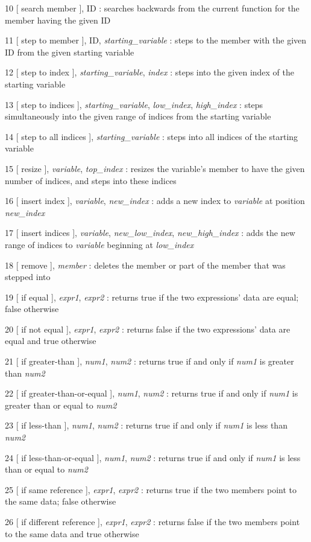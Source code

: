 \documentclass{article}
\begin{document}
\begin{description}
\item{10  [ search member ], ID} : searches backwards from the current function for the member having the given ID
\item{11  [ step to member ], ID, \emph{starting\_variable}} : steps to the member with the given ID from the given starting variable
\item{12  [ step to index ], \emph{starting\_variable}, \emph{index}} : steps into the given index of the starting variable
\item{13  [ step to indices ], \emph{starting\_variable}, \emph{low\_index}, \emph{high\_index}} : steps simultaneously into the given range of indices from the starting variable
\item{14  [ step to all indices ], \emph{starting\_variable}} : steps into all indices of the starting variable
\item{15  [ resize ], \emph{variable}, \emph{top\_index}} : resizes the variable's member to have the given number of indices, and steps into these indices
\item{16  [ insert index ], \emph{variable}, \emph{new\_index}} : adds a new index to \emph{variable} at position \emph{new\_index}
\item{17  [ insert indices ], \emph{variable}, \emph{new\_low\_index}, \emph{new\_high\_index}} : adds the new range of indices to \emph{variable} beginning at \emph{low\_index}
\item{18  [ remove ], \emph{member}} : deletes the member or part of the member that was stepped into

\item{19  [ if equal ], \emph{expr1}, \emph{expr2}} : returns true if the two expressions' data are equal; false otherwise
\item{20  [ if not equal ], \emph{expr1}, \emph{expr2}} : returns false if the two expressions' data are equal and true otherwise
\item{21  [ if greater-than ], \emph{num1}, \emph{num2}} : returns true if and only if \emph{num1} is greater than \emph{num2}
\item{22  [ if greater-than-or-equal ], \emph{num1}, \emph{num2}} : returns true if and only if \emph{num1} is greater than or equal to \emph{num2}
\item{23  [ if less-than ], \emph{num1}, \emph{num2}} : returns true if and only if \emph{num1} is less than \emph{num2}
\item{24  [ if less-than-or-equal ], \emph{num1}, \emph{num2}} : returns true if and only if \emph{num1} is less than or equal to \emph{num2}
\item{25  [ if same reference ], \emph{expr1}, \emph{expr2}} : returns true if the two members point to the same data; false otherwise
\item{26  [ if different reference ], \emph{expr1}, \emph{expr2}} : returns false if the two members point to the same data and true otherwise


\end{description}
\end{document}
